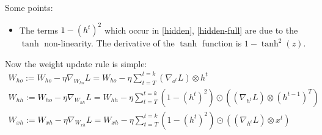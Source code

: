 \documentclass{article}
\newcommand{\G}{\nabla}
\begin{document}
\begin{flushleft}
\begin{itemize}
Some points:
\begin{itemize}
\item The terms \(1 - (h^{t})^{2}\) which occur in \ref{hidden}, \ref{hidden-full} are due to the \(\tanh\) non-linearity. The derivative of the \(\tanh\) function is \(1 - \tanh^{2}(z)\).
\end{itemize}

Now the weight update rule is simple:
\begin{gather}
\displaystyle W_{ho} := W_{ho} - \eta \G_{W_{ho}}L = W_{ho} - \eta \sum_{t=T}^{t=k} (\G_{o^{t}} L) \otimes h^{t} \\
\displaystyle W_{hh} := W_{ho} - \eta \G_{W_{hh}}L = W_{hh} - \eta \sum_{t=T}^{t=k} (1 - (h^{t})^{2}) \odot \left((\G_{h^{t}} L) \otimes (h^{t-1})^{T}\right) \\
\displaystyle W_{xh} := W_{xh} - \eta \G_{W_{xh}}L = W_{xh} - \eta \sum_{t=T}^{t=k} (1 - (h^{t})^{2}) \odot \left((\G_{h^{t}} L) \otimes x^{t}\right)
\end{gather}
\end{itemize}
\end{flushleft}
\end{document}
